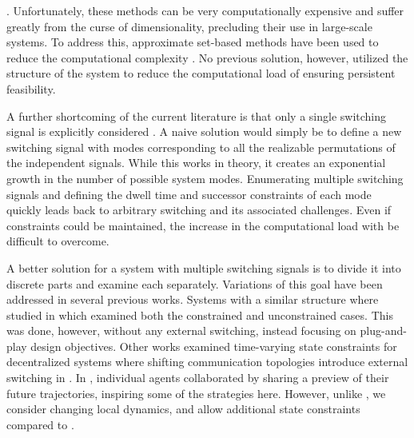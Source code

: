 . Unfortunately, these methods can be very computationally expensive and suffer greatly from the curse of dimensionality, precluding their use in large-scale systems. To address this, approximate set-based methods have been used to reduce the computational complexity . No previous solution, however, utilized the structure of the system to reduce the computational load of ensuring persistent feasibility. 

A further shortcoming of the current literature is that only a single switching signal is explicitly considered . A naive solution would simply be to define a new switching signal with modes corresponding to all the realizable permutations of the independent signals. While this works in theory, it creates an exponential growth in the number of possible system modes. Enumerating multiple switching signals and defining the dwell time and successor constraints of each mode quickly leads back to arbitrary switching and its associated challenges. Even if constraints could be maintained, the increase in the computational load with be difficult to overcome. 

A better solution for a system with multiple switching signals is to divide it into discrete parts and examine each separately. Variations of this goal have been addressed in several previous works. Systems with a similar structure where studied in \cite{Riverso2015} which examined both the constrained and unconstrained cases. This was done, however, without any external switching, instead focusing on plug-and-play design objectives. Other works examined time-varying state constraints for decentralized systems where shifting communication topologies introduce external switching in \cite{Ahandani2020, Li2020}. In \cite{Li2020}, individual agents collaborated by sharing a preview of their future trajectories, inspiring some of the strategies here. However, unlike \cite{Ahandani2020, Li2020}, we consider changing local dynamics, and allow additional state constraints compared to \cite{Li2020}. 

